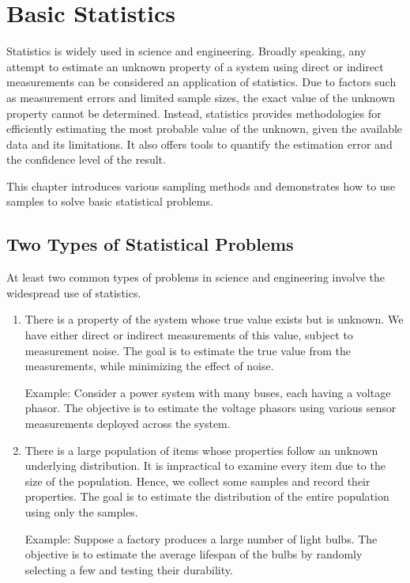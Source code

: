 \chapter{Basic Statistics} \label{ch:statisticsandsampling}

Statistics is widely used in science and engineering. Broadly speaking, any attempt to estimate an unknown property of a system using direct or indirect measurements can be considered an application of statistics. Due to factors such as measurement errors and limited sample sizes, the exact value of the unknown property cannot be determined. Instead, statistics provides methodologies for efficiently estimating the most probable value of the unknown, given the available data and its limitations. It also offers tools to quantify the estimation error and the confidence level of the result.

This chapter introduces various sampling methods and demonstrates how to use samples to solve basic statistical problems.

\section{Two Types of Statistical Problems}

At least two common types of problems in science and engineering involve the widespread use of statistics.

\begin{enumerate}
	\item There is a property of the system whose true value exists but is unknown. We have either direct or indirect measurements of this value, subject to measurement noise. The goal is to estimate the true value from the measurements, while minimizing the effect of noise.

Example: Consider a power system with many buses, each having a voltage phasor. The objective is to estimate the voltage phasors using various sensor measurements deployed across the system.

	\item There is a large population of items whose properties follow an unknown underlying distribution. It is impractical to examine every item due to the size of the population. Hence, we collect some samples and record their properties. The goal is to estimate the distribution of the entire population using only the samples.

Example: Suppose a factory produces a large number of light bulbs. The objective is to estimate the average lifespan of the bulbs by randomly selecting a few and testing their durability.

\end{enumerate}

